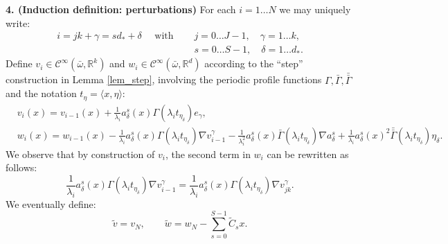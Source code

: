 \documentclass[reqno,twoside,11pt]{amsart}
\newcommand{\R}{\mathbb{R}}
\newcommand*{\dbar}[1]{\bar{\bar{#1}}}
\numberwithin{equation}{section}
\theoremstyle{plain}
\theoremstyle{definition}
\begin{document}
{\bf 4. (Induction definition: perturbations)} For each $i=1\ldots N$ we may uniquely write:
\begin{equation}\label{isj}
\begin{split}
i=jk+\gamma = sd_* + \delta \quad \mbox{ with } \quad  & j=0\ldots J-1,
\quad \gamma=1\ldots k, \\ &  s=0\ldots S-1, \quad \delta=1\ldots d_*.
\end{split}
\end{equation}
Define $v_{i}\in\mathcal{C}^\infty(\bar\omega,\R^k)$ and
$w_i\in\mathcal{C}^\infty(\bar\omega, \R^d)$ according to the ``step''
construction in Lemma \ref{lem_step}, involving the periodic profile functions
$\Gamma, \bar\Gamma, \dbar\Gamma$ and the notation $t_\eta=\langle x, \eta\rangle$:
\begin{equation*}
\begin{split}
& v_i(x) = v_{i-1}(x) + \frac{1}{\lambda_i} a_\delta^s(x)\Gamma(\lambda_i t_{\eta_\delta})e_\gamma,\\
& w_i(x) = w_{i-1}(x) - \frac{1}{\lambda_i} a_\delta^s(x)\Gamma(\lambda_it_{\eta_\delta})\nabla v_{i-1}^\gamma 
-  \frac{1}{\lambda_i^2} a_\delta^s(x)\bar\Gamma(\lambda_it_{\eta_\delta})\nabla a_{\delta}^s
+  \frac{1}{\lambda_i} a_\delta^s(x)^2\dbar\Gamma(\lambda_it_{\eta_\delta})\eta_\delta.
\end{split}
\end{equation*}
We observe that by construction of $v_i$, the second term in $w_{i}$ can be rewritten as follows:
\begin{equation}\label{w_simp}
\frac{1}{\lambda_i} a_\delta^s(x)\Gamma(\lambda_it_{\eta_\delta})\nabla v_{i-1}^\gamma 
= \frac{1}{\lambda_i} a_\delta^s(x)\Gamma(\lambda_it_{\eta_\delta})\nabla v_{jk}^\gamma. 
\end{equation}
We eventually define:
\begin{equation}\label{vw_fin}
\tilde v = v_N,\qquad \tilde w = w_N-\sum_{s=0}^{S-1}\tilde C_sx.
\end{equation}

\medskip
\end{document}
